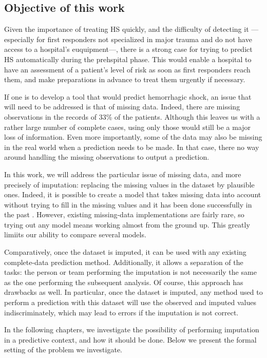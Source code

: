 		\subsection{Objective of this work}
Given the importance of treating HS quickly, and the difficulty of detecting it --- especially for first responders not specialized in major trauma and do not have access to a hospital's euquipment---, there is a strong case for trying to predict HS automatically during the prehspital phase. This would enable a hospital to have an assessment of a patient's level of risk as soon as first responders reach them, and make preparations in advance to treat them urgently if necessary.
		
If one is to develop a tool that would predict hemorrhagic shock, an issue that will need to be addressed is that of missing data. Indeed, there are missing observations in the records of 33\% of the patients. Although this leaves us with a rather large number of complete cases, using only those would still be a major loss of information. Even more importantly, some of the data may also be missing in the real world when a prediction needs to be made. In that case, there no way around handling the missing observations to output a prediction.

In this work, we will address the particular issue of missing data, and more precisely of imputation: replacing the missing values in the dataset by plausible ones. Indeed, it is possible to create a model that takes missing data into account without trying to fill in the missing values and it has been done successfully in the past \cite{miss_model1}\cite{miss_model2}. However, existing missing-data implementations are fairly rare, so trying out any model means working almost from the ground up. This greatly limiits our ability to compare several models.

Comparatively, once the dataset is imputed, it can be used with any existing complete-data prediction method. Additionally, it allows a separation of the tasks: the person or team performing the imputation is not necessarily the same as the one performing the subsequent analysis. Of course, this approach has drawbacks as well. In particular, once the dataset is imputed, any method used to perform a prediction with this dataset will use the observed and imputed values indiscriminately, which may lead to errors if the imputation is not correct.

 In the following chapters, we investigate the possibility of performing imputation in a predictive context, and how it should be done. Below we present the formal setting of the problem we investigate.
 

